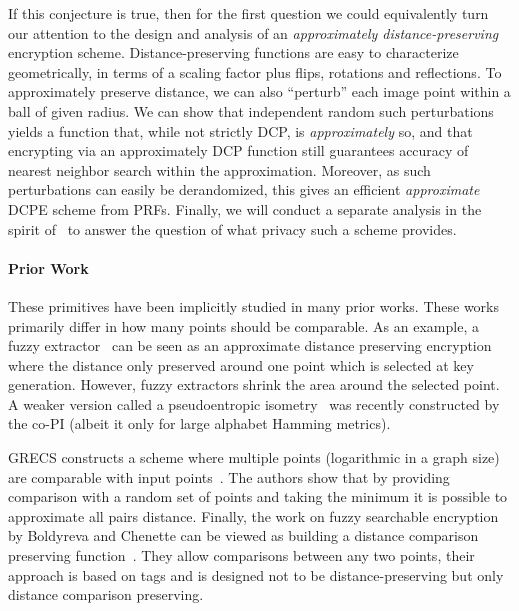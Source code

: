 \documentclass[11pt]{article}
\theoremstyle{remark}
\begin{document}
If this conjecture is true, then for the first question we could equivalently turn our attention to the design and analysis of  an \emph{approximately distance-preserving} encryption scheme. 
Distance-preserving functions are easy to characterize geometrically, in terms of a scaling factor plus flips, rotations and reflections.  To approximately preserve distance, we can also  ``perturb'' each image point within a ball of given radius.  
We can show that independent random such perturbations yields a function that, while not strictly DCP, is \emph{approximately} so, and that encrypting via an approximately DCP function still guarantees accuracy of nearest neighbor  search within the approximation.  Moreover, as such perturbations can easily be derandomized, this gives an efficient \emph{approximate} DCPE scheme from PRFs.  Finally, we will conduct a separate analysis in the spirit of~\cite{C:BolCheOne11} to answer the question of what privacy such a scheme provides.  

\paragraph{Prior Work}
These primitives have been implicitly studied in many prior works.  These works primarily differ in how many points should be comparable.  As an example, a fuzzy extractor~\cite{DRS04} can be seen as an approximate distance preserving encryption where the distance only preserved around one point which is selected at key generation.  However, fuzzy extractors shrink the area around the selected point.  A weaker version called a pseudoentropic isometry~\cite{cryptoeprint:2016:1100} was recently constructed by the co-PI (albeit it only for large alphabet Hamming metrics).

GRECS constructs a scheme where multiple points (logarithmic in a graph size) are comparable with input points~\cite{meng2015grecs}.  The authors show that by providing comparison with a random set of points and taking the minimum it is possible to approximate all pairs distance.
Finally, the work on fuzzy searchable encryption by Boldyreva and Chenette can be viewed as building a distance comparison preserving function~\cite{boldyreva2014efficient}.  They allow comparisons between any two points, their approach is based on tags and is designed not to be distance-preserving but only distance comparison preserving.
\end{document}
